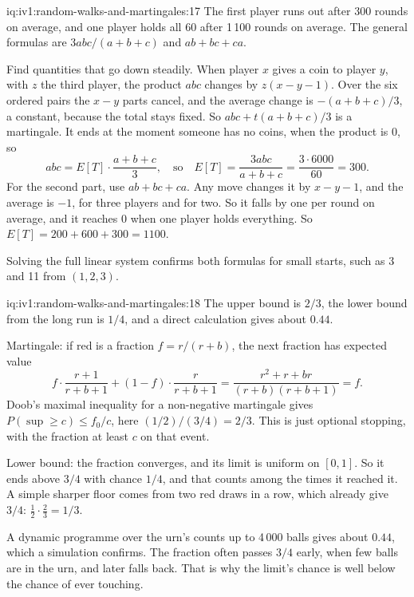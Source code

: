 \begin{solution}{iq:iv1:random-walks-and-martingales:17}
The first player runs out after 300 rounds on average, and one player holds all 60 after 1\,100 rounds on average. The general formulas are $3abc/(a + b + c)$ and $ab + bc + ca$.

Find quantities that go down steadily. When player $x$ gives a coin to player $y$, with $z$ the third player, the product $abc$ changes by $z(x - y - 1)$. Over the six ordered pairs the $x - y$ parts cancel, and the average change is $-(a + b + c)/3$, a constant, because the total stays fixed. So $abc + t(a + b + c)/3$ is a martingale. It ends at the moment someone has no coins, when the product is 0, so
\[
abc = E[T] \cdot \frac{a + b + c}{3}, \quad\text{so}\quad E[T] = \frac{3abc}{a + b + c} = \frac{3 \cdot 6000}{60} = 300.
\]
For the second part, use $ab + bc + ca$. Any move changes it by $x - y - 1$, and the average is $-1$, for three players and for two. So it falls by one per round on average, and it reaches 0 when one player holds everything. So $E[T] = 200 + 600 + 300 = 1100$.

Solving the full linear system confirms both formulas for small starts, such as 3 and 11 from $(1, 2, 3)$.

\end{solution}

\begin{solution}{iq:iv1:random-walks-and-martingales:18}
The upper bound is $2/3$, the lower bound from the long run is $1/4$, and a direct calculation gives about $0.44$.

Martingale: if red is a fraction $f = r/(r + b)$, the next fraction has expected value
\[
f \cdot \frac{r + 1}{r + b + 1} + (1 - f) \cdot \frac{r}{r + b + 1} = \frac{r^2 + r + br}{(r + b)(r + b + 1)} = f.
\]
Doob's maximal inequality for a non-negative martingale gives $P(\sup \ge c) \le f_0/c$, here $(1/2)/(3/4) = 2/3$. This is just optional stopping, with the fraction at least $c$ on that event.

Lower bound: the fraction converges, and its limit is uniform on $[0, 1]$. So it ends above $3/4$ with chance $1/4$, and that counts among the times it reached it. A simple sharper floor comes from two red draws in a row, which already give $3/4$: $\tfrac12 \cdot \tfrac23 = 1/3$.

A dynamic programme over the urn's counts up to 4\,000 balls gives about $0.44$, which a simulation confirms. The fraction often passes $3/4$ early, when few balls are in the urn, and later falls back. That is why the limit's chance is well below the chance of ever touching.

\end{solution}

